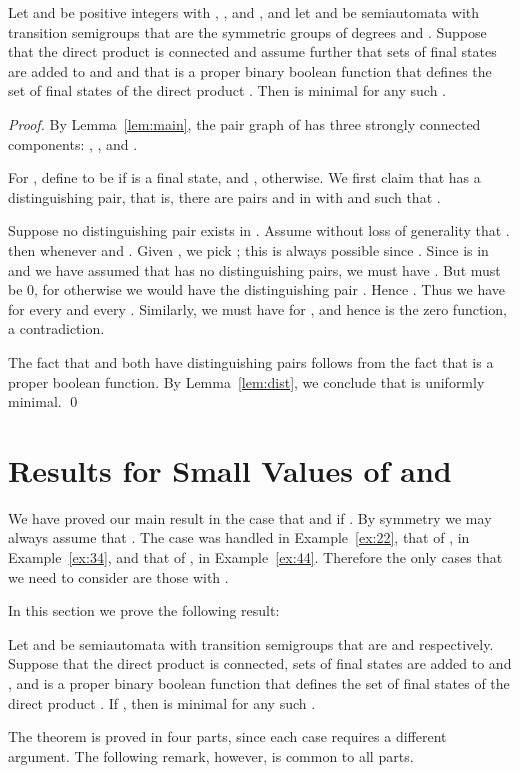 \documentclass{llncs}
\begin{document}
\begin{corollary}
Let  and  be positive integers with , , and , and let  and  be 
semiautomata with transition semigroups  that are the symmetric groups  of degrees  and . Suppose that the direct product  is connected and assume further that sets of final states are added to  and  and that  is a proper binary boolean function that defines the set of final states of the direct product . Then  is minimal for any such .
\label{cor:main}

\end{corollary}
\begin{proof} 
By Lemma~\ref{lem:main}, the pair graph of  has three strongly connected components:
, , and 
.  

For , define  to be  if  is a final state, and  , otherwise.  We first claim that  has a distinguishing pair, that is, there are pairs  and  in  with  and  such that .  

Suppose no distinguishing pair exists in .
Assume without loss of generality that .
 then  whenever  and .  
Given , we pick ; this is always possible since .  
Since  is in  and we have assumed that  has no distinguishing pairs, we must have .
But  must be 0, for otherwise we would have the distinguishing pair .
Hence .   
Thus we have
 for every  and every .  
Similarly, we must have  for ,  and hence  is the zero function, a contradiction.  

The fact that  and  both have distinguishing pairs follows from the fact that  is a proper boolean function.
By Lemma~\ref{lem:dist}, we conclude that   is uniformly minimal.
\qed
\end{proof}


\section{Results for Small Values of  and }
\label{sec:small}
We have proved our main result in the case that  and  if .  By symmetry we may always assume that .  The case  was handled in Example~\ref{ex:22}, that of , in Example~\ref{ex:34}, and that
of , in Example~\ref{ex:44}. Therefore the only cases that we need to consider are those with .  

In this section we prove the following result:
\begin{theorem}
\label{thm: small}
Let  and  be 
semiautomata with transition semigroups that are   and  respectively. Suppose that the direct product  is connected, sets of final states are added to  and , and   is a proper binary boolean function that defines the set of final states of the direct product . If , then  is minimal for any such .
\end{theorem}
The theorem is proved in four parts, since each case requires  a different argument.
The following remark, however, is common to all parts.
\end{document}
